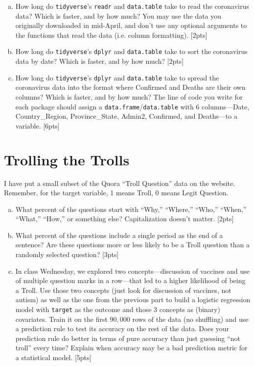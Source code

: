 \documentclass[12pt]{article}
\begin{document}
\begin{enumerate}[(a)]
	\item How long do \verb|tidyverse|'s \verb|readr| and \verb|data.table| take to read the coronavirus data? Which is faster, and by how much? You may use the data you originally downloaded in mid-April, and don't use any optional arguments to the functions that read the data (i.e. column formatting). [2pts]
	\item How long do \verb|tidyverse|'s \verb|dplyr| and \verb|data.table| take to sort the coronavirus data by date? Which is faster, and by how much? [2pts]
	\item How long do \verb|tidyverse|'s \verb|dplyr| and \verb|data.table| take to spread the coronavirus data into the format where Confirmed and Deaths are their own columns? Which is faster, and by how much? The line of code you write for each package should assign a \verb|data.frame|/\verb|data.table| with 6 columns---Date, Country\_Region, Province\_State, Admin2, Confirmed, and Deaths---to a variable. [6pts]
\end{enumerate}

\section{Trolling the Trolls}

I have put a small subset of the Quora ``Troll Question'' data on the website. Remember, for the target variable, 1 means Troll, 0 means Legit Question.

\begin{enumerate}[(a)]
	\item What percent of the questions start with ``Why,'' ``Where,'' ``Who,'' ``When,'' ``What,'' ``How,'' or something else? Capitalization doesn't matter. [2pts]
	\item What percent of the questions include a single period as the end of a sentence? Are these questions more or less likely to be a Troll question than a randomly selected question? [3pts]
	\item In class Wednesday, we explored two concepts---discussion of vaccines and use of multiple question marks in a row---that led to a higher likelihood of being a Troll. Use those two concepts (just look for discussion of vaccines, not autism) as well as the one from the previous part to build a logistic regression model with \verb|target| as the outcome and those 3 concepts as (binary) covariates. Train it on the first $90,000$ rows of the data (no shuffling) and use a prediction rule to test its accuracy on the rest of the data. Does your prediction rule do better in terms of pure accuracy than just guessing ``not troll'' every time? Explain when accuracy may be a bad prediction metric for a statistical model. [5pts]
\end{enumerate}
\end{document}
